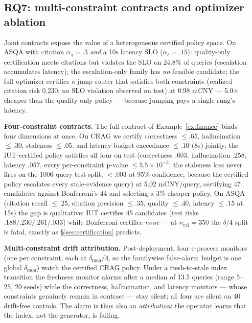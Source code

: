 \subsection{RQ7: multi-constraint contracts and optimizer ablation}
\label{sec:exp-multi}

Joint contracts expose the value of a heterogeneous certified policy
space. On ASQA with citation $\alpha_q{=}.3$ \emph{and} a 10s latency SLO
($\alpha_\ell{=}.15$): quality-only certification meets citations but
violates the SLO on 24.8\% of queries (escalation accumulates latency);
the escalation-only family has \emph{no} feasible candidate; the full
optimizer certifies a jump router that satisfies both constraints
(realized citation risk 0.230; no SLO violation observed on test) at
0.98 mCNY --- 5.0$\times$ cheaper than the
quality-only policy --- because jumping pays a single rung's latency.

\textbf{Four-constraint contracts.} The full contract of
Example~\ref{ex:finance} binds four dimensions at once. On CRAG we
certify correctness $\le .65$, hallucination $\le .30$, staleness
$\le .05$, and latency-budget exceedance $\le .10$ (8s) jointly: the
IUT-certified policy satisfies all four on test (correctness .603,
hallucination .258, latency .057, every per-constraint p-value
$\le 5.5{\times}10^{-3}$; the staleness loss never fires on the
1006-query test split, $<.003$ at 95\% confidence,
because the certified policy escalates every stale-evidence query) at
5.02 mCNY/query, certifying 47 candidates
against Bonferroni's 44 and selecting a 3\% cheaper policy. On ASQA
(citation recall $\le .25$, citation precision $\le .35$, quality
$\le .40$, latency $\le .15$ at 15s) the gap is qualitative: IUT
certifies 45 candidates (test risks $.188/.230/.261/.033$) while
Bonferroni certifies \emph{none} --- at $n_{\mathrm{cal}}{=}350$ the
$\delta/4$ split is fatal, exactly as \S\ref{sec:certification}
predicts.

\textbf{Multi-constraint drift attribution.} Post-deployment, four
e-process monitors (one per constraint, each at $\delta_{\mathrm{mon}}/4$,
so the familywise false-alarm budget is one global
$\delta_{\mathrm{mon}}$) watch the certified CRAG policy. Under a
fresh-to-stale index transition the freshness monitor alarms after a
median of 13.5 queries (range 5--25, 20 seeds) while the correctness,
hallucination, and latency monitors --- whose constraints genuinely
remain in contract --- stay silent; all four are silent on 40
drift-free controls. The alarm is thus also an \emph{attribution}: the
operator learns that the index, not the generator, is failing.

